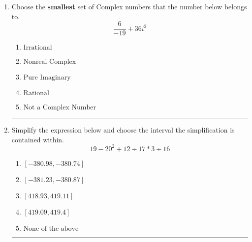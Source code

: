 \documentclass[14pt]{extbook}
\newcommand{\litem}[1]{\item#1\hspace*{-1cm}\rule{\textwidth}{0.4pt}}
\begin{document}
\begin{enumerate}
{\begin{enumerate}[label=\Alph*.]
\end{enumerate} }
\litem{
Choose the \textbf{smallest} set of Complex numbers that the number below belongs to.\[ \frac{6}{-19}+36i^2 \]\begin{enumerate}[label=\Alph*.]
\item \( \text{Irrational} \)
\item \( \text{Nonreal Complex} \)
\item \( \text{Pure Imaginary} \)
\item \( \text{Rational} \)
\item \( \text{Not a Complex Number} \)

\end{enumerate} }
\litem{
Simplify the expression below and choose the interval the simplification is contained within.\[ 19 - 20^2 + 12 \div 17 * 3 \div 16 \]\begin{enumerate}[label=\Alph*.]
\item \( [-380.98, -380.74] \)
\item \( [-381.23, -380.87] \)
\item \( [418.93, 419.11] \)
\item \( [419.09, 419.4] \)
\item \( \text{None of the above} \)

\end{enumerate} }
\end{enumerate}
\end{document}
